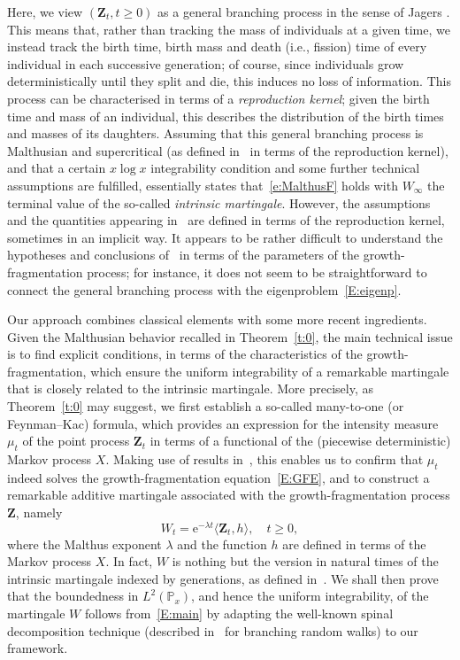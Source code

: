 \documentclass[11pt]{article}
\theoremstyle{definition}
\numberwithin{equation}{section}
\numberwithin{figure}{section}
\numberwithin{table}{section}
\newcommand\Zz{\mathbf{Z}}
\newcommand\PP{\mathbb{P}}
\newcommand\e{\mathrm{e}}
\newcommand{\crochet}[1]{{\langle #1 \rangle}}
\begin{document}
Here, we view $(\Zz_t, t\ge 0)$ as a general branching process in the sense of Jagers \cite{Jagers}. This means that, rather than tracking the mass of individuals at a given time, we instead track the birth time, birth mass and death (i.e., fission) time of every individual in each successive generation; of course, since individuals grow deterministically until they split and die, this induces no loss of information. This process can be characterised in terms of a \emph{reproduction kernel}; given the birth time and mass of an individual, this describes the distribution of the birth times and masses of its daughters. Assuming that this general branching process is Malthusian and supercritical (as defined in~\cite[Section~5]{Jagers} in terms of the reproduction kernel), and that a certain $x\log x$ integrability condition and some further technical assumptions are fulfilled, \cite[Theorem~7.3]{Jagers} essentially states that~\eqref{e:MalthusF} holds with $W_{\infty}$ the terminal value of the so-called \emph{intrinsic martingale}. However, the assumptions and the quantities appearing in~\cite[Theorem~7.3]{Jagers} are defined in terms of the reproduction kernel, sometimes in an implicit way. It appears to be rather difficult to understand the hypotheses and conclusions of~\cite{Jagers} in terms of the parameters of the growth-fragmentation process; for instance, it does not seem to be straightforward to connect the general branching process with the eigenproblem~\eqref{E:eigenp}.



Our approach combines classical elements with some more recent ingredients. Given the Malthusian behavior recalled in Theorem~\ref{t:0}, the main technical issue is to find explicit conditions, in terms of the characteristics of the growth-fragmentation, which ensure the uniform integrability of a remarkable martingale that is closely related to the intrinsic martingale. More precisely, as Theorem~\ref{t:0} may suggest, we first establish a so-called many-to-one (or Feynman--Kac) formula, which provides an expression for the intensity measure $\mu_t$ of the point process $\Zz_t$ in terms of a functional of the (piecewise deterministic) Markov process $X$. Making use of results in~\cite{BW}, this enables us to confirm that $\mu_t$ indeed solves the growth-fragmentation equation~\eqref{E:GFE}, and to construct a remarkable additive martingale associated with the growth-fragmentation process $\Zz$, namely
\[
W_t=\e^{-\lambda t} \crochet{\Zz_t, h},\quad t\geq 0,
\]
where the Malthus exponent $\lambda$ and the function $h$ are defined in terms of the Markov process $X$. In fact, $W$ is nothing but the version in natural times of the intrinsic martingale indexed by generations, as defined in~\cite[Section~5]{Jagers}. We shall then prove that the boundedness in $L^2(\PP_x)$, and hence the uniform integrability, of the martingale $W$ follows from~\eqref{E:main} by adapting the well-known spinal decomposition technique (described in~\cite{BigKyp} for branching random walks) to our framework.
\end{document}
